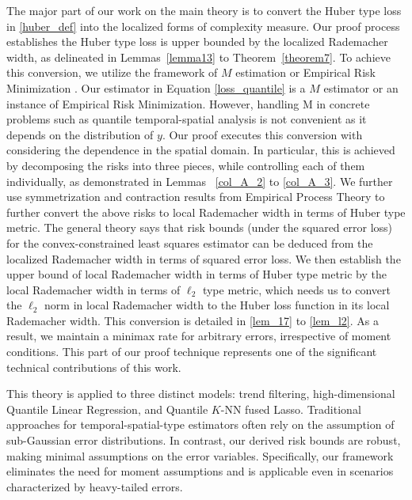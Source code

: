 \documentclass[twoside,11pt]{article}
\begin{document}
The major part of our work on the main theory is to convert the Huber type loss in \eqref{huber_def} into the localized forms of complexity measure. Our proof process establishes the Huber type loss is upper bounded by the localized Rademacher width, as delineated in Lemmas~\ref{lemma13} to Theorem~\ref{theorem7}.  
To achieve this conversion, we utilize the framework of $M$ estimation or Empirical Risk Minimization \cite{mammen1997locally}. Our estimator in Equation \eqref{loss_quantile} is a $M$ estimator or an instance of  Empirical Risk Minimization. 
However, handling M in concrete problems such as quantile temporal-spatial analysis is not convenient as it depends
on the distribution of $y$. 
Our proof executes this conversion with considering the dependence in the spatial domain. In particular, this is achieved by decomposing the risks into three pieces, while controlling each of them individually, as demonstrated in Lemmas ~\ref{col_A_2} to 
\ref{col_A_3}. 
We further use symmetrization and contraction results from Empirical Process Theory to further convert the above risks to local Rademacher width in terms of Huber type metric. 
The general theory says that risk bounds (under the
squared error loss) for the convex-constrained least squares estimator can be deduced from the localized Rademacher width in terms of squared error loss. 
We then establish the upper bound of local Rademacher width in terms of Huber type metric by the local Rademacher width in terms of $\ell_2$ type metric, which needs us to convert the $\ell_2$ norm in local Rademacher width to the Huber loss function in its local Rademacher width. This conversion is detailed in \ref{lem_17} to \ref{lem_l2}. 
As a result, we maintain a minimax rate for arbitrary errors, irrespective of moment conditions. This part of our proof technique represents one of the significant technical contributions of this work.

This theory is applied to three distinct models: trend filtering, high-dimensional Quantile Linear Regression, and Quantile \(K\)-NN fused Lasso. Traditional approaches for temporal-spatial-type estimators often rely on the assumption of sub-Gaussian error distributions. In contrast, our derived risk bounds are robust, making minimal assumptions on the error variables. Specifically, our framework eliminates the need for moment assumptions and is applicable even in scenarios characterized by heavy-tailed errors.
\end{document}

